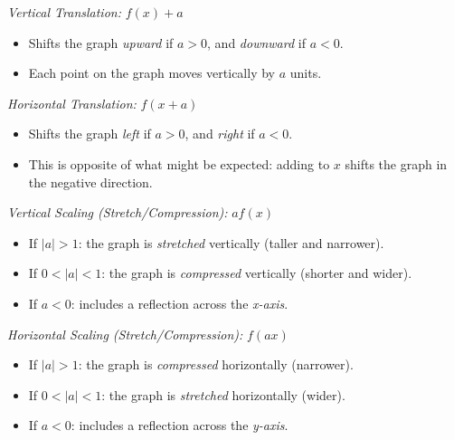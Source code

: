 \emph{Vertical Translation:} \( f(x) + a \)
	    
\begin{itemize}
	
	\item Shifts the graph \emph{upward} if \( a > 0 \), and \emph{downward} if \( a < 0 \).
	
	\item Each point on the graph moves vertically by \(a\) units.

\end{itemize}

\emph{Horizontal Translation:} \( f(x + a) \)

\begin{itemize}

	\item Shifts the graph \emph{left} if \( a > 0 \), and \emph{right} if \( a < 0 \).

	\item This is opposite of what might be expected: adding to \(x\) shifts the graph in the negative 
	      direction.

\end{itemize}

\emph{Vertical Scaling (Stretch/Compression):} \( a f(x) \)

\begin{itemize}
	
	\item If \( |a| > 1 \): the graph is \emph{stretched} vertically (taller and narrower).
	
	\item If \( 0 < |a| < 1 \): the graph is \emph{compressed} vertically (shorter and wider).
	
	\item If \( a < 0 \): includes a reflection across the \emph{x-axis}.

\end{itemize}

\emph{Horizontal Scaling (Stretch/Compression):} \( f(a x) \)

\begin{itemize}

	\item If \( |a| > 1 \): the graph is \emph{compressed} horizontally (narrower).

	\item If \( 0 < |a| < 1 \): the graph is \emph{stretched} horizontally (wider).

	\item If \( a < 0 \): includes a reflection across the \emph{y-axis}.

\end{itemize}

